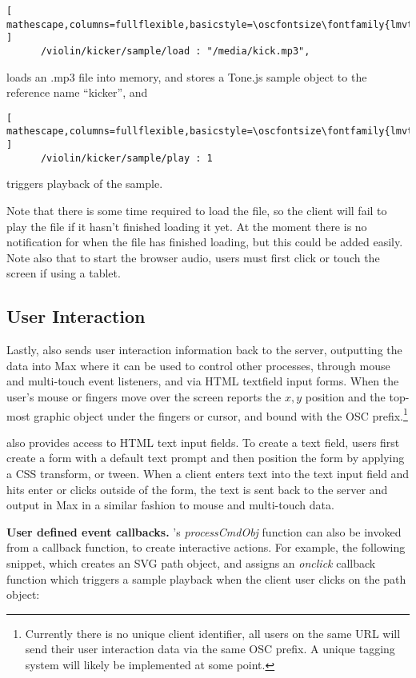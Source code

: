 \begin{lstlisting}[ mathescape,columns=fullflexible,basicstyle=\oscfontsize\fontfamily{lmvtt}\selectfont ]
      /violin/kicker/sample/load : "/media/kick.mp3",
\end{lstlisting}
\noindent
loads an .mp3 file into memory, and stores a Tone.js sample object to the reference name ``kicker'', and

\begin{lstlisting}[ mathescape,columns=fullflexible,basicstyle=\oscfontsize\fontfamily{lmvtt}\selectfont ]
      /violin/kicker/sample/play : 1
\end{lstlisting}
\noindent
triggers playback of the sample.

Note that there is some time required to load the file, so the client will fail to play the file if it hasn't finished loading it yet. At the moment there is no notification for when the file has finished loading, but this could be added easily.
Note also that to start the browser audio, users must first click or touch the screen if using a tablet.

\subsection{User Interaction}\label{sec:interaction}
Lastly, \drawsocket also sends user interaction information back to the server, outputting the data into Max where it can be used to control other processes, through mouse and multi-touch event listeners, and via HTML textfield input forms.
When the user's mouse or fingers move over the screen \drawsocket reports the $x,y$ position and the top-most graphic object under the fingers or cursor, and bound with the OSC prefix.\footnote{Currently there is no unique client identifier, all users on the same URL will send their user interaction data via the same OSC prefix. A unique tagging system will likely be implemented at some point.}

\drawsocket also provides access to HTML text input fields. To create a text field, users first create a form with a default text prompt and then position the form by applying a CSS transform, or tween. When a client enters text into the text input field and hits enter or clicks outside of the form, the text is sent back to the server and output in Max in a similar fashion to mouse and multi-touch data.

\medskip
\noindent
\textbf{User defined event callbacks.}
\drawsocket's \textit{processCmdObj} function can also be invoked from a callback function, to create interactive actions. For example, the following snippet, which creates an SVG path object, and assigns an \textit{onclick} callback function which triggers a sample playback when the client user clicks on the path object:

